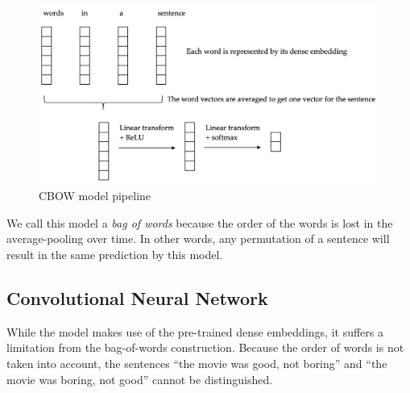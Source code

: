 \documentclass[11pt]{article}
\begin{document}
\begin{figure}[htb]
\centering
\includegraphics[width=\textwidth]{figs/cbow}
\caption{CBOW model pipeline}
\label{fig:cbow}
\end{figure}

We call this model a \emph{bag of words} because the order of the words is lost
in the average-pooling over time. In other words, any permutation of a sentence
will result in the same prediction by this model. 

\subsection{Convolutional Neural Network}
\label{subsec:convnet}

While the  model makes use of the pre-trained dense
embeddings, it suffers a limitation from the bag-of-words construction. Because
the order of words is not taken into account, the sentences ``the movie was
good, not boring'' and ``the movie was boring, not good'' cannot be
distinguished. 
\end{document}
